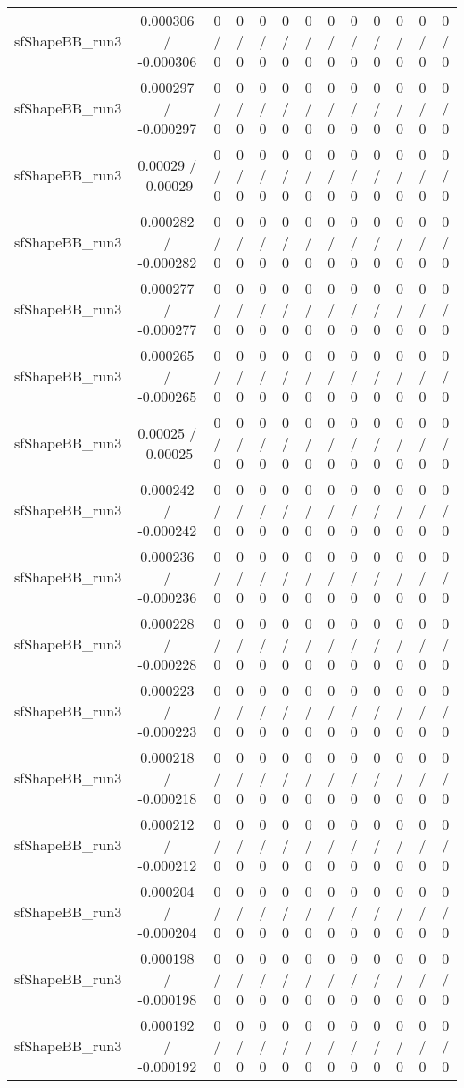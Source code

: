 \documentclass[10pt]{article}
\begin{document}
\begin{table}[htbp]
\begin{center}
\begin{tabular}{|c|c|c|c|c|c|c|c|c|c|c|c|c|}
  sfShapeBB_run3 & 0.000306 / -0.000306 & 0 / 0 & 0 / 0 & 0 / 0 & 0 / 0 & 0 / 0 & 0 / 0 & 0 / 0 & 0 / 0 & 0 / 0 & 0 / 0 & 0 / 0 \\ 
  sfShapeBB_run3 & 0.000297 / -0.000297 & 0 / 0 & 0 / 0 & 0 / 0 & 0 / 0 & 0 / 0 & 0 / 0 & 0 / 0 & 0 / 0 & 0 / 0 & 0 / 0 & 0 / 0 \\ 
  sfShapeBB_run3 & 0.00029 / -0.00029 & 0 / 0 & 0 / 0 & 0 / 0 & 0 / 0 & 0 / 0 & 0 / 0 & 0 / 0 & 0 / 0 & 0 / 0 & 0 / 0 & 0 / 0 \\ 
  sfShapeBB_run3 & 0.000282 / -0.000282 & 0 / 0 & 0 / 0 & 0 / 0 & 0 / 0 & 0 / 0 & 0 / 0 & 0 / 0 & 0 / 0 & 0 / 0 & 0 / 0 & 0 / 0 \\ 
  sfShapeBB_run3 & 0.000277 / -0.000277 & 0 / 0 & 0 / 0 & 0 / 0 & 0 / 0 & 0 / 0 & 0 / 0 & 0 / 0 & 0 / 0 & 0 / 0 & 0 / 0 & 0 / 0 \\ 
  sfShapeBB_run3 & 0.000265 / -0.000265 & 0 / 0 & 0 / 0 & 0 / 0 & 0 / 0 & 0 / 0 & 0 / 0 & 0 / 0 & 0 / 0 & 0 / 0 & 0 / 0 & 0 / 0 \\ 
  sfShapeBB_run3 & 0.00025 / -0.00025 & 0 / 0 & 0 / 0 & 0 / 0 & 0 / 0 & 0 / 0 & 0 / 0 & 0 / 0 & 0 / 0 & 0 / 0 & 0 / 0 & 0 / 0 \\ 
  sfShapeBB_run3 & 0.000242 / -0.000242 & 0 / 0 & 0 / 0 & 0 / 0 & 0 / 0 & 0 / 0 & 0 / 0 & 0 / 0 & 0 / 0 & 0 / 0 & 0 / 0 & 0 / 0 \\ 
  sfShapeBB_run3 & 0.000236 / -0.000236 & 0 / 0 & 0 / 0 & 0 / 0 & 0 / 0 & 0 / 0 & 0 / 0 & 0 / 0 & 0 / 0 & 0 / 0 & 0 / 0 & 0 / 0 \\ 
  sfShapeBB_run3 & 0.000228 / -0.000228 & 0 / 0 & 0 / 0 & 0 / 0 & 0 / 0 & 0 / 0 & 0 / 0 & 0 / 0 & 0 / 0 & 0 / 0 & 0 / 0 & 0 / 0 \\ 
  sfShapeBB_run3 & 0.000223 / -0.000223 & 0 / 0 & 0 / 0 & 0 / 0 & 0 / 0 & 0 / 0 & 0 / 0 & 0 / 0 & 0 / 0 & 0 / 0 & 0 / 0 & 0 / 0 \\ 
  sfShapeBB_run3 & 0.000218 / -0.000218 & 0 / 0 & 0 / 0 & 0 / 0 & 0 / 0 & 0 / 0 & 0 / 0 & 0 / 0 & 0 / 0 & 0 / 0 & 0 / 0 & 0 / 0 \\ 
  sfShapeBB_run3 & 0.000212 / -0.000212 & 0 / 0 & 0 / 0 & 0 / 0 & 0 / 0 & 0 / 0 & 0 / 0 & 0 / 0 & 0 / 0 & 0 / 0 & 0 / 0 & 0 / 0 \\ 
  sfShapeBB_run3 & 0.000204 / -0.000204 & 0 / 0 & 0 / 0 & 0 / 0 & 0 / 0 & 0 / 0 & 0 / 0 & 0 / 0 & 0 / 0 & 0 / 0 & 0 / 0 & 0 / 0 \\ 
  sfShapeBB_run3 & 0.000198 / -0.000198 & 0 / 0 & 0 / 0 & 0 / 0 & 0 / 0 & 0 / 0 & 0 / 0 & 0 / 0 & 0 / 0 & 0 / 0 & 0 / 0 & 0 / 0 \\ 
  sfShapeBB_run3 & 0.000192 / -0.000192 & 0 / 0 & 0 / 0 & 0 / 0 & 0 / 0 & 0 / 0 & 0 / 0 & 0 / 0 & 0 / 0 & 0 / 0 & 0 / 0 & 0 / 0 \\ 

\end{tabular}
\end{center}
\end{table}
\end{document}
